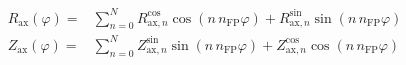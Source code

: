 \documentclass[a4paper, 12pt]{article}
\begin{document}
\begin{align*}
R_\mathrm{ax}(\varphi) =& \sum\limits_{n=0}^{N}   R_{\mathrm{ax}, n}^\mathrm{cos} \cos \left( n \, n_\mathrm{FP} \varphi \right)
                                                + R_{\mathrm{ax}, n}^\mathrm{sin} \sin \left( n \, n_\mathrm{FP} \varphi \right) \\
Z_\mathrm{ax}(\varphi) =& \sum\limits_{n=0}^{N}   Z_{\mathrm{ax}, n}^\mathrm{sin} \sin \left( n \, n_\mathrm{FP} \varphi \right)
                                                + Z_{\mathrm{ax}, n}^\mathrm{cos} \cos \left( n \, n_\mathrm{FP} \varphi \right)
\end{align*}
\end{document}
